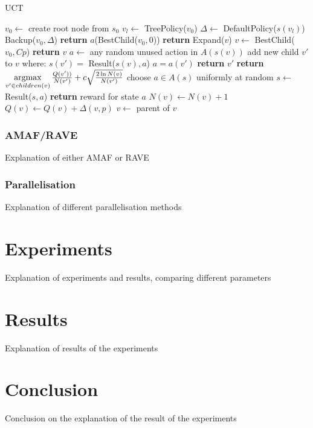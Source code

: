 \documentclass{ba-kecs}
\begin{document}
\begin{algorithm}
	\caption{UCT}
    \label{UCT}
    \begin{algorithmic}
        	\State $v_0 \leftarrow$ create root node from $s_0$
            	\State $v_l \leftarrow$ TreePolicy($v_0$)
                \State $\Delta \leftarrow$ DefaultPolicy($s(v_l)$)
                \State Backup($v_0, \Delta$)
            \EndWhile
            \State \textbf{return} $a$(BestChild($v_0,0$))
        \EndFunction
        \State
                	\State \textbf{return} Expand($v$)
                \Else
                	\State $v \leftarrow$ BestChild($v_0,Cp$)
                \EndIf
            \EndWhile
           	\State \textbf{return} $v$
        \EndFunction
        \State
        	\State $a\leftarrow$ any random unused action in $A(s(v))$
            \State add new child $v'$ to $v$ where:
            \State $s(v') =$ Result($s(v),a$)
            \State $a = a(v')$
            \State \textbf{return} $v'$
        \EndFunction
        \State
        	\State \textbf{return} $\operatornamewithlimits{arg max}\limits_{v' \in children(v)}\frac{Q(v'))}{N(v')} + c\sqrt{\frac{2\ln N(v)}{N(v')}}
$
        \EndFunction
        \State
            	\State choose $a \in A(s)$ uniformly at random
                \State $s \leftarrow$ Result($s, a$)
                \State \textbf{return} reward for state $a$
            \EndWhile
        \EndFunction
        \State
            	\State $N(v) \leftarrow N(v)+1$
                \State $Q(v) \leftarrow Q(v)+\Delta(v,p)$
                \State $v \leftarrow$ parent of $v$
            \EndWhile
        \EndFunction
    \end{algorithmic}
\end{algorithm}
\subsubsection{AMAF/RAVE}

Explanation of either AMAF or RAVE \cite{gelly2011monte}
\subsubsection{Parallelisation}
Explanation of different parallelisation methods

\section{Experiments}
Explanation of experiments and results, comparing different parameters
\section{Results}
Explanation of results of the experiments
\section{Conclusion}
Conclusion on the explanation of the result of the experiments

\end{document}
